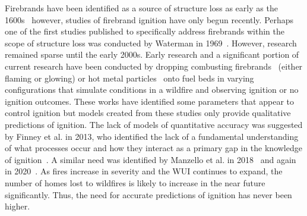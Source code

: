     
    Firebrands have been identified as a source of structure loss as early as the 1600s~\cite{Suzuki2020} however, studies of firebrand ignition have only begun recently. Perhaps one of the first studies published to specifically address firebrands within the scope of structure loss was conducted by Waterman in 1969~\cite{Waterman1969ExperiemntalGeneration}. However, research remained sparse until the early 2000s. Early research and a significant portion of current research have been conducted by dropping combusting firebrands~\cite{Ellis2011, Ellis2015, Ganteaume2009, Manzello2006, Manzello2006a} (either flaming or glowing) or hot metal particles~\cite{Wang2017, Urban2017, Fernandez-Pello2015, Hadden2011} onto fuel beds in varying configurations that simulate conditions in a wildfire and observing ignition or no ignition outcomes. These works have identified some parameters that appear to control ignition but models created from these studies only provide qualitative predictions of ignition. The lack of models of quantitative accuracy was suggested by Finney et al. in 2013, who identified the lack of a fundamental understanding of what processes occur and how they interact as a primary gap in the knowledge of ignition~\cite{Finney2013}. A similar need was identified by Manzello et al. in 2018~\cite{Manzello2018} and again in 2020~\cite{Manzello2020}. As fires increase in severity and the WUI continues to expand, the number of homes lost to wildfires is likely to increase in the near future significantly. Thus, the need for accurate predictions of ignition has never been higher. 
    
    
